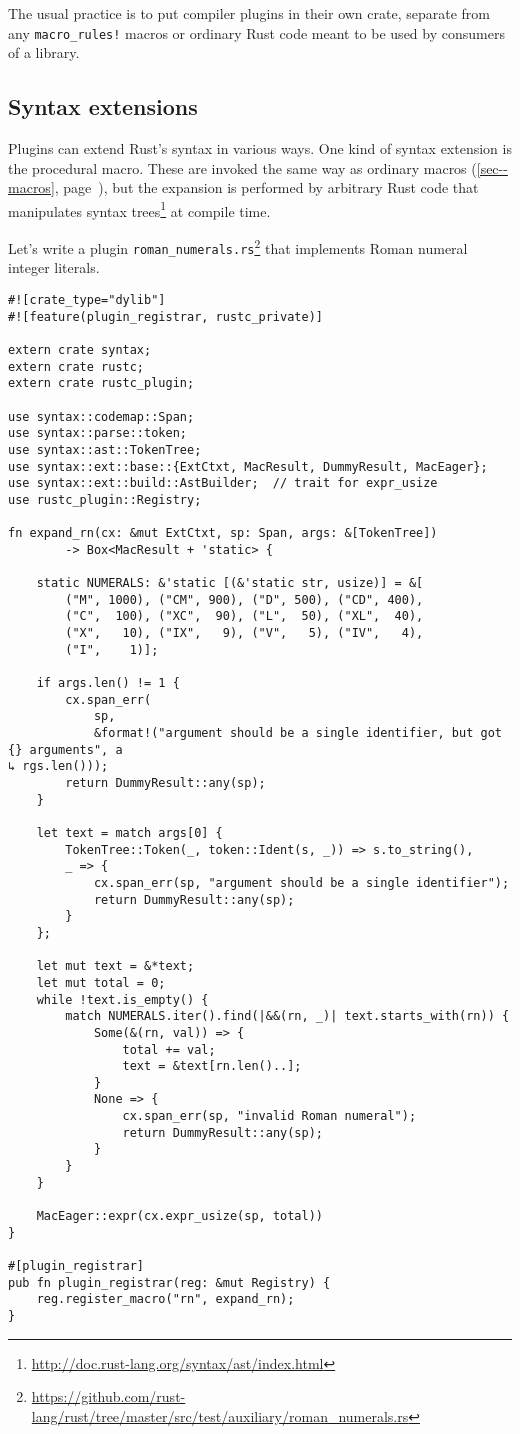 \documentclass[a4paper,]{book}
\renewcommand*{\hyperref}[2][\ar]{%
  \def\ar{#2}%
  #2 (\autoref{#1}, page~\pageref{#1})}
\renewcommand{\href}[2]{#2\footnote{\url{#1}}}
\begin{document}
The usual practice is to put compiler plugins in their own crate,
separate from any \texttt{macro\_rules!} macros or ordinary Rust code
meant to be used by consumers of a library.

\subsection{Syntax extensions}\label{syntax-extensions}

Plugins can extend Rust's syntax in various ways. One kind of syntax
extension is the procedural macro. These are invoked the same way as
\hyperref[sec--macros]{ordinary macros}, but the expansion is performed
by arbitrary Rust code that manipulates
\href{http://doc.rust-lang.org/syntax/ast/index.html}{syntax trees} at
compile time.

Let's write a plugin
\href{https://github.com/rust-lang/rust/tree/master/src/test/auxiliary/roman_numerals.rs}{\texttt{roman\_numerals.rs}}
that implements Roman numeral integer literals.

\begin{verbatim}
#![crate_type="dylib"]
#![feature(plugin_registrar, rustc_private)]

extern crate syntax;
extern crate rustc;
extern crate rustc_plugin;

use syntax::codemap::Span;
use syntax::parse::token;
use syntax::ast::TokenTree;
use syntax::ext::base::{ExtCtxt, MacResult, DummyResult, MacEager};
use syntax::ext::build::AstBuilder;  // trait for expr_usize
use rustc_plugin::Registry;

fn expand_rn(cx: &mut ExtCtxt, sp: Span, args: &[TokenTree])
        -> Box<MacResult + 'static> {

    static NUMERALS: &'static [(&'static str, usize)] = &[
        ("M", 1000), ("CM", 900), ("D", 500), ("CD", 400),
        ("C",  100), ("XC",  90), ("L",  50), ("XL",  40),
        ("X",   10), ("IX",   9), ("V",   5), ("IV",   4),
        ("I",    1)];

    if args.len() != 1 {
        cx.span_err(
            sp,
            &format!("argument should be a single identifier, but got {} arguments", a
↳ rgs.len()));
        return DummyResult::any(sp);
    }

    let text = match args[0] {
        TokenTree::Token(_, token::Ident(s, _)) => s.to_string(),
        _ => {
            cx.span_err(sp, "argument should be a single identifier");
            return DummyResult::any(sp);
        }
    };

    let mut text = &*text;
    let mut total = 0;
    while !text.is_empty() {
        match NUMERALS.iter().find(|&&(rn, _)| text.starts_with(rn)) {
            Some(&(rn, val)) => {
                total += val;
                text = &text[rn.len()..];
            }
            None => {
                cx.span_err(sp, "invalid Roman numeral");
                return DummyResult::any(sp);
            }
        }
    }

    MacEager::expr(cx.expr_usize(sp, total))
}

#[plugin_registrar]
pub fn plugin_registrar(reg: &mut Registry) {
    reg.register_macro("rn", expand_rn);
}
\end{verbatim}
\end{document}
